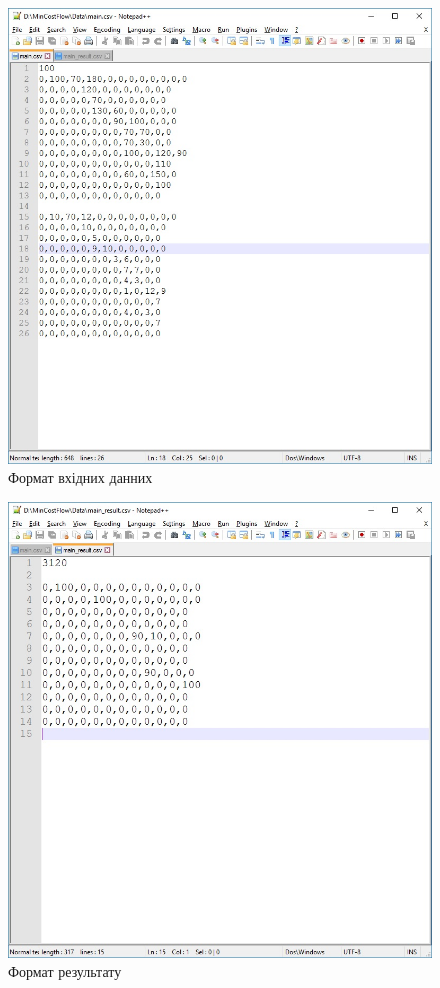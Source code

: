 \documentclass[a4paper,14pt,russian,ukrainian,oneside,final]{extreport}
\begin{document}
\begin{figure}[h]
\begin{center}
\includegraphics[scale=0.8]{data_in.jpg}
\caption{Формат вхідних данних}
\end{center}
\end{figure}

\begin{figure}[h]
\begin{center}
\includegraphics[scale=0.8]{data_out.jpg}
\caption{Формат результату}
\end{center}
\end{figure}
\end{document}
